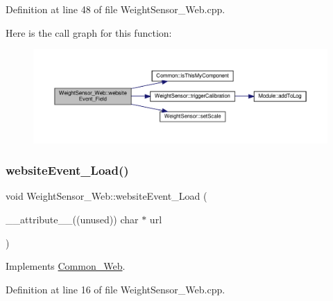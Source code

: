 Definition at line 48 of file Weight\+Sensor\+\_\+\+Web.\+cpp.

Here is the call graph for this function\+:
\nopagebreak
\begin{figure}[H]
\begin{center}
\leavevmode
\includegraphics[width=350pt]{class_weight_sensor___web_a450714f6d3c278a2f7ee97b10ec503c6_cgraph}
\end{center}
\end{figure}
\mbox{\label{class_weight_sensor___web_ac0e106b3dbf03e5dd05e35f1f2305eb3}} 
\subsubsection{\texorpdfstring{website\+Event\+\_\+\+Load()}{websiteEvent\_Load()}}
{\footnotesize\ttfamily void Weight\+Sensor\+\_\+\+Web\+::website\+Event\+\_\+\+Load (\begin{DoxyParamCaption}\item[{\+\_\+\+\_\+attribute\+\_\+\+\_\+((unused)) char $\ast$}]{url }\end{DoxyParamCaption})\hspace{0.3cm}{\ttfamily [virtual]}}



Implements \hyperlink{class_common___web_a5ce0d5ce6f63279c3b624371d8a76211}{Common\+\_\+\+Web}.



Definition at line 16 of file Weight\+Sensor\+\_\+\+Web.\+cpp.

\mbox{\label{class_weight_sensor___web_aa47b67e39e6cbd1b543e482c94160a66}} 
